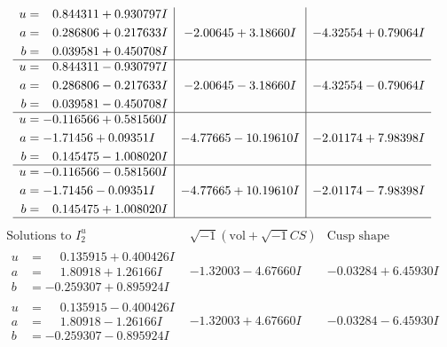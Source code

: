\documentclass[1p]{elsarticle_modified}
\theoremstyle{definition}
\newcommand{\I}{\sqrt{-1}}
\begin{document}
$$\begin{array}{c|c|c}
\begin{aligned}
u &= \phantom{-}0.844311 + 0.930797 I \\
a &= \phantom{-}0.286806 + 0.217633 I \\
b &= \phantom{-}0.039581 + 0.450708 I\end{aligned}
 & -2.00645 + 3.18660 I & -4.32554 + 0.79064 I \\ \hline\begin{aligned}
u &= \phantom{-}0.844311 - 0.930797 I \\
a &= \phantom{-}0.286806 - 0.217633 I \\
b &= \phantom{-}0.039581 - 0.450708 I\end{aligned}
 & -2.00645 - 3.18660 I & -4.32554 - 0.79064 I \\ \hline\begin{aligned}
u &= -0.116566 + 0.581560 I \\
a &= -1.71456 + 0.09351 I \\
b &= \phantom{-}0.145475 - 1.008020 I\end{aligned}
 & -4.77665 - 10.19610 I & -2.01174 + 7.98398 I \\ \hline\begin{aligned}
u &= -0.116566 - 0.581560 I \\
a &= -1.71456 - 0.09351 I \\
b &= \phantom{-}0.145475 + 1.008020 I\end{aligned}
 & -4.77665 + 10.19610 I & -2.01174 - 7.98398 I\\
 \hline 
 \end{array}$$\newpage$$\begin{array}{c|c|c}  
\text{Solutions to }I^u_{2}& \I (\text{vol} + \sqrt{-1}CS) & \text{Cusp shape}\\
 \hline 
\begin{aligned}
u &= \phantom{-}0.135915 + 0.400426 I \\
a &= \phantom{-}1.80918 + 1.26166 I \\
b &= -0.259307 + 0.895924 I\end{aligned}
 & -1.32003 - 4.67660 I & -0.03284 + 6.45930 I \\ \hline\begin{aligned}
u &= \phantom{-}0.135915 - 0.400426 I \\
a &= \phantom{-}1.80918 - 1.26166 I \\
b &= -0.259307 - 0.895924 I\end{aligned}
 & -1.32003 + 4.67660 I & -0.03284 - 6.45930 I \\ \hline\begin{aligned}

\end{aligned}
\end{array}$$
\end{document}
